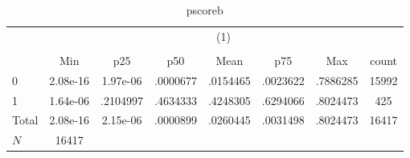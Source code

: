 \begin{table}[htbp]\centering
\def\sym#1{\ifmmode^{#1}\else\(^{#1}\)\fi}
\caption{pscoreb}
\begin{tabular}{l*{1}{ccccccc}}
\hline\hline
          &\multicolumn{7}{c}{(1)}                                              \\
          &\multicolumn{7}{c}{}                                                 \\
          &      Min&      p25&      p50&     Mean&      p75&      Max&    count\\
\hline
0         & 2.08e-16& 1.97e-06& .0000677& .0154465& .0023622& .7886285&    15992\\
1         & 1.64e-06& .2104997& .4634333& .4248305& .6294066& .8024473&      425\\
Total     & 2.08e-16& 2.15e-06& .0000899& .0260445& .0031498& .8024473&    16417\\
\hline
\(N\)     &    16417&         &         &         &         &         &         \\
\hline\hline
\end{tabular}
\end{table}
